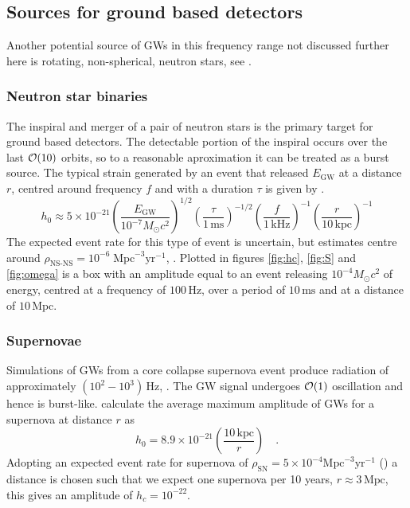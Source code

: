 \documentclass[fleqn,12pt]{iopart}
\newcommand{\Msun}{\ensuremath{M_{ \odot }}}
\begin{document}
\subsection{Sources for ground based detectors}
Another potential source of GWs in this frequency range not discussed further here is rotating, non-spherical, neutron stars, see \cite{2013ASPC..467...59S}.

\subsubsection{Neutron star binaries}
The inspiral and merger of a pair of neutron stars is the primary target for ground based detectors. The detectable portion of the inspiral occurs over the last ${\cal{O}}(10)$ orbits, so to a reasonable aproximation it can be treated as a burst source. The typical strain generated by an event that released $E_{\textrm{GW}}$ at a distance $r$, centred around frequency $f$ and with a duration $\tau$ is given by \cite{2013ASPC..467...59S}.
\begin{equation} h_{0}\approx 5\times 10^{-21}\left(\frac{E_{\textrm{GW}}}{10^{-7}\Msun c^{2}}\right)^{1/2}\left( \frac{\tau}{1\,\textrm{ms}} \right)^{-1/2}\left( \frac{f}{1\,\textrm{kHz}} \right)^{-1}\left( \frac{r}{10\,\textrm{kpc}} \right)^{-1} \end{equation}
The expected event rate for this type of event is uncertain, but estimates centre around $\rho_{\textrm{NS-NS}}=10^{-6}\;\textrm{Mpc}^{-3}\textrm{yr}^{-1}$, \cite{2011PrPNP..66..239A}. Plotted in figures \ref{fig:hc}, \ref{fig:S} and \ref{fig:omega} is a box with an amplitude equal to an event releasing $10^{-4}\Msun c^{2}$ of energy, centred at a frequency of $100\,\textrm{Hz}$, over a period of $10\,\textrm{ms}$ and at a distance of $10\,\textrm{Mpc}$.

\subsubsection{Supernovae}
Simulations of GWs from a core collapse supernova event produce radiation of approximately $(10^{2}-10^{3})\,\textrm{Hz}$, \cite{2002A&A...393..523D}. The GW signal undergoes ${\cal{O}}(1)$ oscillation and hence is burst-like. \cite{2002A&A...393..523D} calculate the average maximum amplitude of GWs for a supernova at distance $r$ as
\begin{equation} h_{0}=8.9\times 10^{-21}\left( \frac{10 \,\textrm{kpc}}{r} \right) \quad .\end{equation}
Adopting an expected event rate for supernova of $\rho_{\textrm{SN}}=5\times10^{-4}\textrm{Mpc}^{-3}\textrm{yr}^{-1}$ (\cite{2013ASPC..467...59S}) a distance is chosen such that we expect one supernova per 10 years, $r\approx 3 \,\textrm{Mpc}$, this gives an amplitude of $h_{c}=10^{-22}$.
\end{document}
